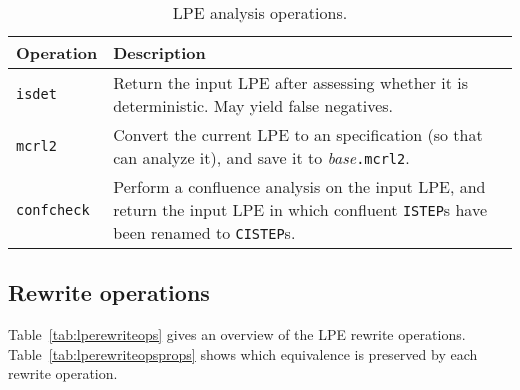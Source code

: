 \begin{table}[!ht]
\begin{center}
\begin{tabularx}{\linewidth}{l|X|}
\textbf{Operation} & \textbf{Description} \\ \hline
\texttt{isdet} & Return the input LPE after assessing whether it is deterministic. May yield false negatives. \\ \hline
\texttt{mcrl2} & Convert the current LPE to an \mcrl{} specification (so that \mcrl{} can analyze it), and save it to \textit{base}\texttt{.mcrl2}. \\ \hline
\texttt{confcheck} & Perform a confluence analysis on the input LPE, and return the input LPE in which confluent \texttt{ISTEP}s have been renamed to \texttt{CISTEP}s. \\ \hline
\end{tabularx}
\caption{LPE analysis operations.}
\label{tab:lpeanalysisops}
\end{center}
\end{table}

\subsection{Rewrite operations}

Table~\ref{tab:lperewriteops} gives an overview of the LPE rewrite operations.
Table~\ref{tab:lperewriteopsprops} shows which equivalence is preserved by each rewrite operation.

